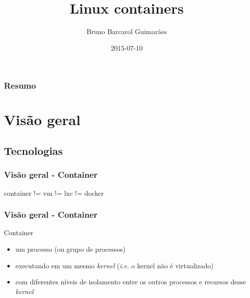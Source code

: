 \documentclass{beamer}
\title[Linux containers]{Linux containers}
\author{Bruno Barcarol Guimarães}
\institute[]{\textit{bbgstb@gmail.com}}
\date{2015-07-10}
\begin{document}
\begin{frame}
    \titlepage
\end{frame}

\begin{frame}
    \frametitle{Resumo}
    \tableofcontents
\end{frame}

\section{Visão geral}

\subsection{Tecnologias}

\begin{frame}
    \frametitle{Visão geral - Container}
    container != vm != lxc != docker
\end{frame}

\begin{frame}
    \frametitle{Visão geral - Container}
    Container
    \begin{itemize}
        \item um processo (ou grupo de processos)
        \item executando em um mesmo \textit{kernel} (\textit{i.e.} o kernel
        não é virtualizado)
        \item com diferentes níveis de isolamento entre os outros processos e
        recursos desse \textit{kernel}
    \end{itemize}
\end{frame}
\end{document}
